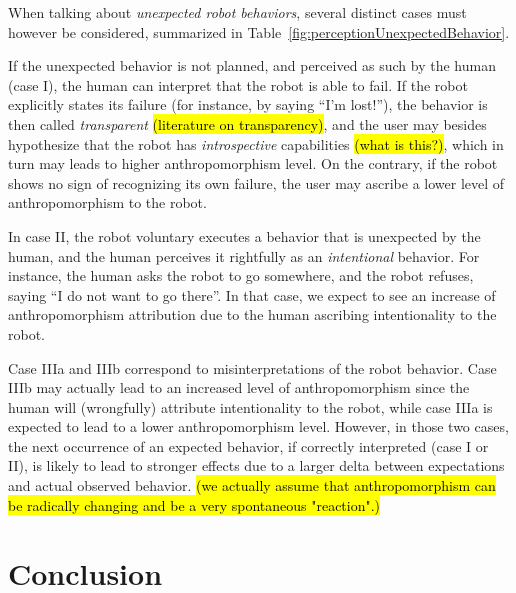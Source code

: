 \documentclass[lettersize, apacite, twoside, HRI]{apa_HRI}
\begin{document}
When talking about \emph{unexpected robot behaviors}, several distinct cases
must however be considered, summarized in Table~\ref{fig:perceptionUnexpectedBehavior}.

If the unexpected behavior is not planned, and perceived as such by the human
(case I), the human can interpret that the robot is able to fail. If the robot
explicitly states its failure (for instance, by saying ``I'm lost!''), the
behavior is then called \emph{transparent}  \hl{(literature on transparency)}, and the
user may besides hypothesize that the robot has \emph{introspective}
capabilities \hl{(what is this?)}, which in turn may leads to higher anthropomorphism level.  On the
contrary, if the robot shows no sign of recognizing its own failure, the user
may ascribe a lower level of anthropomorphism to the robot.

In case II, the robot voluntary executes a behavior that is unexpected by the
human, and the human perceives it rightfully as an \emph{intentional} behavior.
For instance, the human asks the robot to go somewhere, and the robot refuses,
saying ``I do not want to go there''. In that case, we expect to see an
increase of anthropomorphism attribution due to the human ascribing
intentionality to the robot.

Case IIIa and IIIb correspond to misinterpretations of the robot behavior. Case
IIIb may actually lead to an increased level of anthropomorphism since the human
will (wrongfully) attribute intentionality to the robot, while case IIIa is
expected to lead to a lower anthropomorphism level.  However, in those two
cases, the next occurrence of an expected behavior, if correctly interpreted
(case I or II), is likely to lead to stronger effects due to a larger delta
between expectations and actual observed behavior. \hl{(we actually assume that anthropomorphism can be radically changing and be a very spontaneous "reaction".)}




%
%
%
%
%
%


\section{Conclusion}
\label{sec:9}
\end{document}
